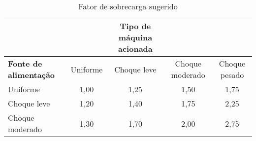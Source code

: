 \begin{table}[!htb]
    \centering
    \caption{{\label{tab:1} Fator de sobrecarga sugerido}}
    \begin{tabular}{lcccc}
    \hline
&&\textbf{Tipo de máquina acionada} \\\hline
\textbf{Fonte de alimentação} &Uniforme &Choque leve &Choque moderado &Choque pesado\\\hline
Uniforme    &1,00 &1,25 &1,50 &1,75 \\\hline
Choque leve &1,20 &1,40 &1,75 &2,25 \\\hline
Choque moderado & 1,30 & 1,70  & 2,00  & 2,75 \\\hline
    \end{tabular}
\end{table}